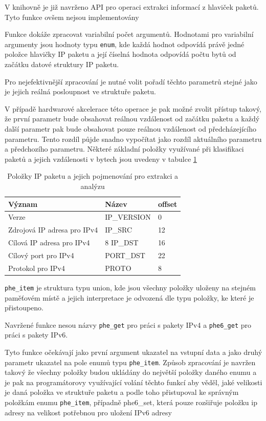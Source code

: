 V knihovně je již navrženo API pro operaci extrakci informací z hlaviček paketů. Tyto
funkce ovšem nejsou implementovány


Funkce dokáže zpracovat variabilní počet argumentů.
Hodnotami pro variabilní argumenty jsou hodnoty typu \texttt{enum}, kde každá hodnot odpovídá
právě jedné položce hlavičky IP paketu a její číselná hodnota odpovídá počtu bytů
od začátku datové struktury IP paketu.

Pro nejefektivnější zpracování je nutné volit pořadí těchto parametrů stejné jako je jejich reálná
posloupnost ve struktuře paketu.

V případě hardwarové akcelerace této operace je pak možné zvolit přístup takový,
že první parametr bude obsahovat reálnou vzdálenost od začátku paketu a každý další parametr
pak bude obsahovat pouze reálnou vzdálenost od předcházejícího parametru. Tento rozdíl
půjde snadno vypočítat jako rozdíl aktuálního parametru a předchozího parametru.
Některé základní položky využívané při klasifikaci paketů a jejich vzdálenosti v bytech
jsou uvedeny v tabulce \ref{tab:phe}

\begin{table}[!htbp]
	\center
	\label{tab:phe}
    \begin{tabular}{|l|l|l|}
    \hline
    Význam & Název & offset \\ \hline
    Verze & IP\_VERSION & 0 \\ \hline
    Zdrojová IP adresa pro IPv4 & IP\_SRC & 12 \\ \hline
    Cílová IP adresa pro IPv4 & 8 IP\_DST & 16 \\ \hline
    Cílový port pro IPv4 & PORT\_DST & 22 \\ \hline
    Protokol pro IPv4 & PROTO & 8 \\ \hline
    \end{tabular}
	\caption{Položky IP paketu a jejich pojmenování pro extrakci a analýzu}
\end{table}

\texttt{phe\_item} je struktura typu union, kde jsou všechny položky uloženy na stejném paměťovém místě
a jejich interpretace je odvozená dle typu položky, ke které je přistoupeno.

Navržené funkce nesou názvy \texttt{phe\_get} pro práci s pakety IPv4 a \texttt{phe6\_get}
pro práci s pakety IPv6.

Tyto funkce očekávají jako první argument ukazatel na vstupní data a jako druhý parametr
ukazatel na pole enumů typu \texttt{phe\_item}. Způsob zpracování je navržen takový
že všechny položky budou ukládány do největší položky daného enumu a je pak na programátorovy
využívající volání těchto funkcí aby věděl, jaké velikosti je daná položka ve struktuře paketu
a podle toho přistupoval ke správným položkám enumu \texttt{phe\_item}, případně phe6\_set,
která pouze rozšiřuje položku ip adresy na velikost potřebnou pro uložení IPv6 adresy


